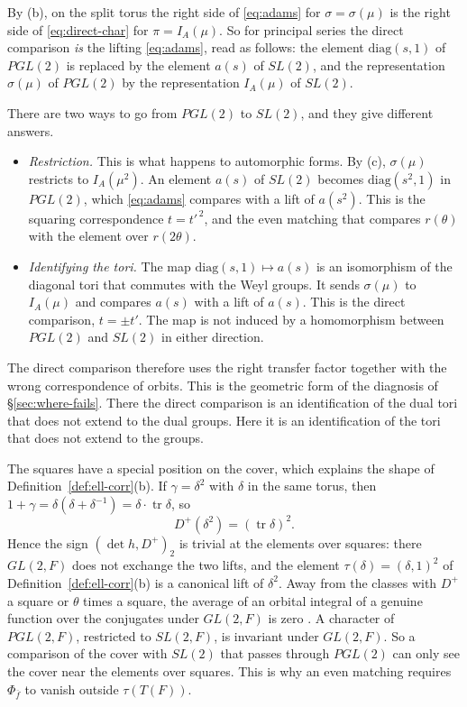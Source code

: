 \documentclass[12pt,letterpaper,openany]{book}
\theoremstyle{plain}
\theoremstyle{definition}
\theoremstyle{remark}
\theoremstyle{remark}
\newcommand{\tr}{\operatorname{tr}}
\begin{document}
By (b), on the split torus the right side of \eqref{eq:adams} for
$\sigma=\sigma(\mu)$ is the right side of \eqref{eq:direct-char} for
$\pi=I_A(\mu)$. So for principal series the direct comparison \emph{is}
the lifting \eqref{eq:adams}, read as follows: the element
$\mathrm{diag}(s,1)$ of $PGL(2)$ is replaced by the element $a(s)$ of
$SL(2)$, and the representation $\sigma(\mu)$ of $PGL(2)$ by the
representation $I_A(\mu)$ of $SL(2)$.

There are two ways to go from $PGL(2)$ to $SL(2)$, and they give
different answers.
\begin{itemize}
\item \emph{Restriction.} This is what happens to automorphic forms. By
(c), $\sigma(\mu)$ restricts to $I_A(\mu^2)$. An element $a(s)$ of
$SL(2)$ becomes $\mathrm{diag}(s^2,1)$ in $PGL(2)$, which
\eqref{eq:adams} compares with a lift of $a(s^2)$. This is the squaring
correspondence $t=t'^{\,2}$, and the even matching that compares
$r(\theta)$ with the element over $r(2\theta)$.
\item \emph{Identifying the tori.} The map
$\mathrm{diag}(s,1)\mapsto a(s)$ is an isomorphism of the diagonal tori
that commutes with the Weyl groups. It sends $\sigma(\mu)$ to $I_A(\mu)$
and compares $a(s)$ with a lift of $a(s)$. This is the direct
comparison, $t=\pm t'$. The map is not induced by a homomorphism between
$PGL(2)$ and $SL(2)$ in either direction.
\end{itemize}
The direct comparison therefore uses the right transfer factor together
with the wrong correspondence of orbits. This is the geometric form of
the diagnosis of \S\ref{sec:where-fails}. There the direct comparison is
an identification of the dual tori that does not extend to the dual
groups. Here it is an identification of the tori that does not extend to
the groups.

The squares have a special position on the cover, which explains the
shape of Definition~\ref{def:ell-corr}(b). If $\gamma=\delta^2$ with
$\delta$ in the same torus, then
$1+\gamma=\delta(\delta+\delta^{-1})=\delta\cdot\tr\delta$, so
\[
D^+(\delta^2)=(\tr\delta)^2 .
\]
Hence the sign $(\det h,D^+)_2$ is trivial at the elements over squares:
there $GL(2,F)$ does not exchange the two lifts, and the element
$\tau(\delta)=(\delta,1)^2$ of Definition~\ref{def:ell-corr}(b) is a
canonical lift of $\delta^2$. Away from the classes with $D^+$ a square
or $\theta$ times a square, the average of an orbital integral of a
genuine function over the conjugates under $GL(2,F)$ is zero
\cite[Lemma~7.6(b)]{JC}. A character of $PGL(2,F)$, restricted to
$SL(2,F)$, is invariant under $GL(2,F)$. So a comparison of the cover
with $SL(2)$ that passes through $PGL(2)$ can only see the cover near
the elements over squares. This is why an even matching requires
$\Phi_{\overline f}$ to vanish outside $\tau(T(F))$.
\end{document}
